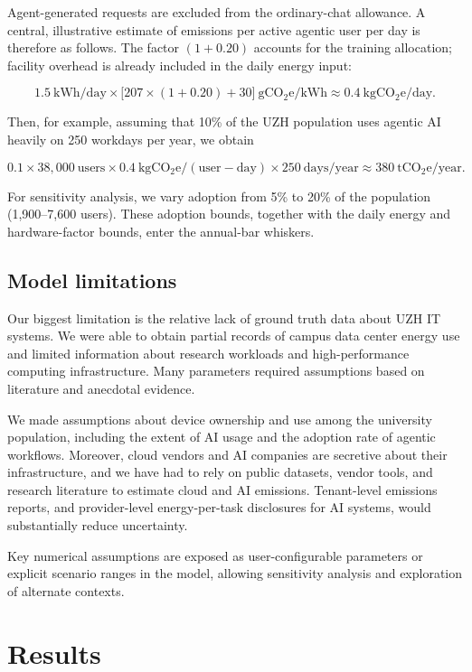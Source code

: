 \documentclass[11pt]{article}
\begin{document}
Agent-generated requests are excluded from the ordinary-chat allowance.
A central, illustrative estimate of emissions per active agentic user per day
is therefore as follows. The factor $(1+0.20)$ accounts for the training
allocation; facility overhead is already included in the daily energy input:

\[ 1.5~\mathrm{kWh/day} \times \bigl[207 \times (1+0.20) + 30\bigr]~\mathrm{gCO_2e/kWh} \approx 0.4~\mathrm{kgCO_2e/day}. \]

Then, for example, assuming that 10\% of the UZH population uses agentic AI
heavily on 250 workdays per year, we obtain

\[ 0.1 \times 38{,}000~\mathrm{users} \times 0.4~\mathrm{kgCO_2e/(user-day)} \times 250~\mathrm{days/year} \approx 380~\mathrm{tCO_2e/year}. \]

For sensitivity analysis, we vary adoption from 5\% to 20\% of the population
(1,900--7,600 users). These adoption bounds, together with the daily energy and
hardware-factor bounds, enter the annual-bar whiskers.

\subsection{Model limitations}

Our biggest limitation is the relative lack of ground truth data about UZH IT
systems. We were able to obtain partial records of campus data center energy use
and limited information about research workloads and high-performance computing
infrastructure. Many parameters required assumptions based on literature and
anecdotal evidence.

We made assumptions about device ownership and use among the university
population, including the extent of AI usage and the adoption rate of agentic
workflows. Moreover, cloud vendors and AI companies are secretive about their
infrastructure, and we have had to rely on public datasets, vendor tools, and
research literature to estimate cloud and AI emissions. Tenant-level emissions
reports, and provider-level energy-per-task disclosures for AI systems, would
substantially reduce uncertainty.

Key numerical assumptions are exposed as user-configurable parameters or
explicit scenario ranges in the model, allowing sensitivity analysis and
exploration of alternate contexts.

\section{Results}
\label{sec:results}
\end{document}
